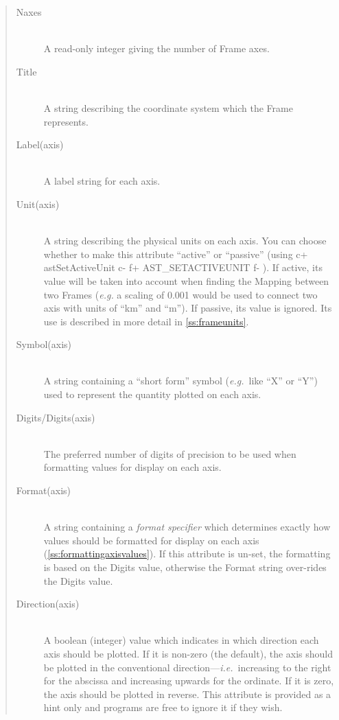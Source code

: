 \documentclass[twoside,11pt]{article}
\newcommand{\secref}[1]{\S\ref{#1}}
\renewcommand{\secref}[1]{\ref{#1}}
\begin{document}
\begin{quote}
\begin{description}
\item[Naxes]\mbox{}\\
A read-only integer giving the number of Frame axes.

\item[Title]\mbox{}\\
A string describing the coordinate system which the Frame represents.

\item[Label(axis)]\mbox{}\\
A label string for each axis.

\item[Unit(axis)]\mbox{}\\
A string describing the physical units on each axis. You can choose
whether to make this attribute ``active'' or ``passive'' (using
c+
astSetActiveUnit
c-
f+
AST\_SETACTIVEUNIT
f-
). If active, its value will be taken into account when finding the
Mapping between two Frames (\emph{e.g.} a scaling of 0.001 would be used
to connect two axis with units of ``km'' and ``m''). If passive, its value
is ignored. Its use is described in more detail in \secref{ss:frameunits}.

\item[Symbol(axis)]\mbox{}\\
A string containing a ``short form'' symbol ({\em{e.g.}}\ like ``X''
or ``Y'') used to represent the quantity plotted on each axis.

\item[Digits/Digits(axis)]\mbox{}\\
The preferred number of digits of precision to be used when formatting
values for display on each axis.

\item[Format(axis)]\mbox{}\\
A string containing a {\em{format specifier}} which determines exactly
how values should be formatted for display on each axis
(\secref{ss:formattingaxisvalues}). If this attribute is un-set, the
formatting is based on the Digits value, otherwise the Format string
over-rides the Digits value.

\item[Direction(axis)]\mbox{}\\
A boolean (integer) value which indicates in which direction each axis
should be plotted. If it is non-zero (the default), the axis should be
plotted in the conventional direction---{\em{i.e.}}\ increasing to the
right for the abscissa and increasing upwards for the ordinate. If it
is zero, the axis should be plotted in reverse.  This attribute is
provided as a hint only and programs are free to ignore it if they
wish.


\end{description}
\end{quote}
\end{document}
